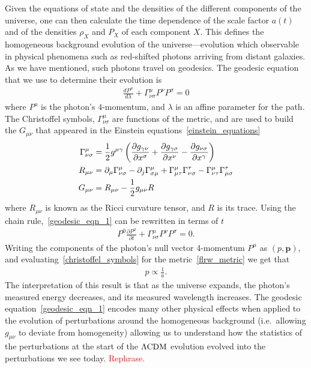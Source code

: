     Given the equations of state and the densities of the different
    components of the universe, one can then calculate the time dependence of the
    scale factor $a(t)$ and of the densities $\rho_X$ and $P_X$ of each component $X$.
    This defines the homogeneous background evolution of the universe---evolution
    which observable in physical phenomena
    such as red-shifted photons arriving from distant galaxies.
    As we have mentioned, such
    photons travel on geodesics. The geodesic equation that we use to determine
    their evolution is
    \begin{align}\label{geodesic_eqn_1}
        \frac{dP^\mu}{d\lambda}+\Gamma^\mu_{\nu\sigma}P^\nu P^\sigma=0
    \end{align}
    where $P^a$ is the photon's $4$-momentum, and $\lambda$ is an affine parameter
    for the path.
    The Christoffel symbols, $\Gamma^\mu_{\nu\sigma}$ are functions of the
    metric, and are used to build the $G_{\mu\nu}$ that appeared in the Einstein equations~\eqref{einstein_equations}
    \begin{align}
        \Gamma^\mu_{\nu\sigma} &= \frac{1}{2}g^{\mu\gamma}\left(
        \frac{\partial g_{\gamma\nu}}{\partial x^{\sigma}}
        +\frac{\partial g_{\gamma\sigma}}{\partial x^{\nu}}
        -\frac{\partial g_{\nu\sigma}}{\partial x^{\gamma}}
        \right)\label{christoffel_symbols}\\
        R_{\mu \nu} &= \partial_\mu \Gamma^\mu_{\nu \sigma}-\partial_j\Gamma^\mu_{\sigma\mu}+
        \Gamma^\mu_{\mu \tau}\Gamma^\tau_{\nu \sigma}-\Gamma^\mu_{\nu \tau}\Gamma^\tau_{\mu \sigma}\label{ricci_tensor}\\
        G_{\mu\nu} &= R_{\mu\nu} - \frac{1}{2}g_{\mu\nu}R\label{einstein_tensor}
    \end{align}
    where $R_{\mu \nu}$ is known as the Ricci curvature tensor, and $R$ is its trace.
    Using the chain rule,~\eqref{geodesic_eqn_1} can be rewritten in terms of $t$
    \begin{align}
        P^{0}\frac{\partial P^\mu}{\partial t}+\Gamma^\mu_{\nu\sigma}P^\nu P^\sigma=0.
    \end{align}
    Writing the components of the photon's null vector 4-momentum $P^\mu$
    as $(p, \mathbf{p})$, and evaluating~\eqref{christoffel_symbols}
    for the metric~\eqref{flrw_metric} we get that
    \begin{align}\label{eq:redshifting}
        p\propto \frac{1}{a}.
    \end{align}
    The interpretation of this result is that as the universe expands,
    the photon's measured energy decreases, and its measured wavelength increases.
    The geodesic equation~\eqref{geodesic_eqn_1} encodes many other physical effects when applied
    to the evolution of perturbations around the homogeneous background
    (i.e.\, allowing $g_{\mu\nu}$ to deviate from homogeneity)
    allowing us to understand how the statistics of the perturbations at the
    start of the $\Lambda\text{CDM}$ evolution evolved into the perturbations we see today.
    \textcolor{red}{Rephrase.}


